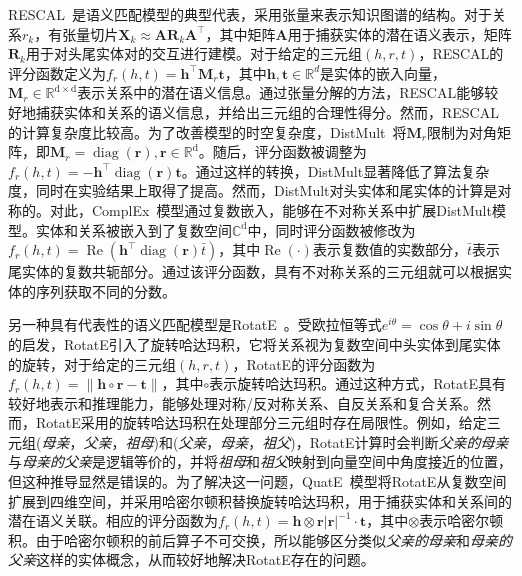 \documentclass[algorithmlist, AutoFakeBold, AutoFakeSlant, figurelist, tablelist, nomlist, engineering]{seuthesix}
\begin{document}
RESCAL~\cite{nickel2011three}是语义匹配模型的典型代表，采用张量来表示知识图谱的结构。对于关系$r_k$，有张量切片$\mathbf{X}_k \approx \mathbf{A} \mathbf{R}_k \mathbf{A}^{\top}$，其中矩阵$\mathbf{A}$用于捕获实体的潜在语义表示，矩阵$\mathbf{R}_k$用于对头尾实体对的交互进行建模。对于给定的三元组$(h, r, t)$，RESCAL的评分函数定义为$f_r(h, t)=\bm{h}^{\top} \mathbf{M}_r \bm{t}$，其中$\bm{h}, \bm{t} \in \mathbb{R}^d$是实体的嵌入向量，$\mathbf{M}_r \in \mathbb{R}^\mathrm{d \times d}$表示关系中的潜在语义信息。通过张量分解的方法，RESCAL能够较好地捕获实体和关系的语义信息，并给出三元组的合理性得分。然而，RESCAL的计算复杂度比较高。为了改善模型的时空复杂度，DistMult~\cite{yang2015embedding}将$\mathbf{M}_r$限制为对角矩阵，即$\mathbf{M}_r=\operatorname{diag}(\bm{r}), \bm{r} \in \mathbb{R}^\mathrm{d}$。随后，评分函数被调整为$f_r(h, t)=-\bm{h}^{\top} \operatorname{diag}(\bm{r}) \bm{t}$。通过这样的转换，DistMult显著降低了算法复杂度，同时在实验结果上取得了提高。然而，DistMult对头实体和尾实体的计算是对称的。对此，ComplEx~\cite{trouillon2016complex}模型通过复数嵌入，能够在不对称关系中扩展DistMult模型。实体和关系被嵌入到了复数空间$\mathbb{C}^\mathrm{d}$中，同时评分函数被修改为$f_r(h, t)=\operatorname{Re}\left(\bm{h}^{\top} \operatorname{diag}(\bm{r}) \bar{t}\right)$，其中$\operatorname{Re}(\cdot)$表示复数值的实数部分，$\bar{t}$表示尾实体的复数共轭部分。通过该评分函数，具有不对称关系的三元组就可以根据实体的序列获取不同的分数。

另一种具有代表性的语义匹配模型是RotatE~\cite{sun2018rotate}。受欧拉恒等式$e^{i \theta}=\cos \theta + i \sin \theta$的启发，RotatE引入了旋转哈达玛积，它将关系视为复数空间中头实体到尾实体的旋转，对于给定的三元组$(h, r, t)$，RotatE的评分函数为$f_r(h, t) = \|\bm{h} \circ \bm{r} - \bm{t}\|$，其中$\circ$表示旋转哈达玛积。通过这种方式，RotatE具有较好地表示和推理能力，能够处理对称/反对称关系、自反关系和复合关系。然而，RotatE采用的旋转哈达玛积在处理部分三元组时存在局限性。例如，给定三元组(\textit{母亲}，\textit{父亲}，\textit{祖母})和(\textit{父亲}，\textit{母亲}，\textit{祖父})，RotatE计算时会判断\textit{父亲的母亲}与\textit{母亲的父亲}是逻辑等价的，并将\textit{祖母}和\textit{祖父}映射到向量空间中角度接近的位置，但这种推导显然是错误的。为了解决这一问题，QuatE~\cite{zhang2019quaternion}模型将RotatE从复数空间扩展到四维空间，并采用哈密尔顿积替换旋转哈达玛积，用于捕获实体和关系间的潜在语义关联。相应的评分函数为$f_r(h, t)=\bm{h} \otimes \bm{r}|\bm{r}|^{-1} \cdot \bm{t}$，其中$\otimes$表示哈密尔顿积。由于哈密尔顿积的前后算子不可交换，所以能够区分类似\textit{父亲的母亲}和\textit{母亲的父亲}这样的实体概念，从而较好地解决RotatE存在的问题。
\end{document}
